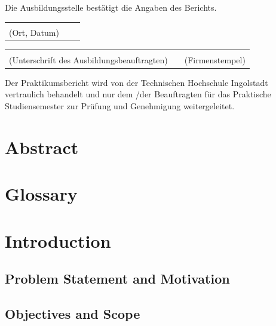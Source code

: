 \documentclass[11pt, a4paper, oneside]{scrartcl}
\begin{document}
\begin{titlepage}
        \vspace{0.5cm}
        Die Ausbildungsstelle bestätigt die Angaben des Berichts.\par
        \vspace{1.5cm}
        \noindent
        \begin{tabular}{@{}p{7cm}p{1cm}p{7cm}@{}}
            \dotfill\\
            \multicolumn{1}{l}{(Ort, Datum)}
        \end{tabular}
        \par
        \vspace{2cm}
        \noindent
        \begin{tabular}{@{}p{7cm}p{1cm}p{7cm}@{}}
            \dotfill & & \dotfill \\
            \multicolumn{1}{l}{
                (Unterschrift des Ausbildungsbeauftragten)
            } & & \multicolumn{1}{l}{
                (Firmenstempel)
            }
        \end{tabular}

        \vspace{1.5cm}
        \noindent
        Der Praktikumsbericht wird von der Technischen Hochschule Ingolstadt vertraulich behandelt
        und nur dem /der Beauftragten für das Praktische Studiensemester zur Prüfung und Genehmigung
        weitergeleitet.\par
    \end{titlepage}

    \section*{Abstract}

    \tableofcontents

    \section*{Glossary}

    \section{Introduction}

        \subsection{Problem Statement and Motivation}

        \subsection{Objectives and Scope}
\end{document}
